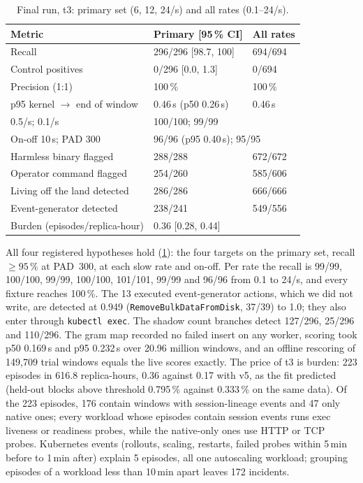 \begin{table}[t]
\centering\small
\caption{Final run, t3: primary set (6, 12, 24/s) and all rates (0.1--24/s).}
\label{tab:final}
\begin{tabular}{@{}lll@{}}
\toprule
Metric & Primary [95\,\% CI] & All rates \\
\midrule
Recall & 296/296 [98.7, 100] & 694/694 \\
Control positives & 0/296 [0.0, 1.3] & 0/694 \\
Precision (1:1) & 100\,\% & 100\,\% \\
p95 kernel $\to$ end of window & 0.46\,s (p50 0.26\,s) & 0.46\,s \\
0.5/s; 0.1/s & \multicolumn{2}{l}{100/100; 99/99} \\
On-off 10\,s; PAD 300 & \multicolumn{2}{l}{96/96 (p95 0.40\,s); 95/95} \\
Harmless binary flagged & 288/288 & 672/672 \\
Operator command flagged & 254/260 & 585/606 \\
Living off the land detected & 286/286 & 666/666 \\
Event-generator detected & 238/241 & 549/556 \\
Burden (episodes/replica-hour) & \multicolumn{2}{l}{0.36 [0.28, 0.44]} \\
\bottomrule
\end{tabular}
\end{table}

All four registered hypotheses hold (\cref{tab:final}): the four targets on the primary set, recall $\ge 95\,\%$ at
PAD~300, at each slow rate and on-off. Per rate the recall is 99/99, 100/100, 99/99, 100/100, 101/101, 99/99 and 96/96
from 0.1 to 24/s, and every fixture reaches 100\,\%. The 13 executed event-generator actions, which we did not write,
are detected at 0.949 (\texttt{RemoveBulkDataFromDisk}, 37/39) to 1.0; they also enter through \texttt{kubectl exec}.
The shadow count branches detect 127/296, 25/296 and 110/296. The gram map recorded no failed insert on any worker,
scoring took p50 0.169\,s and p95 0.232\,s over 20.96 million windows, and an offline rescoring of 149{,}709 trial
windows equals the live scores exactly. The price of t3 is burden: 223 episodes in 616.8 replica-hours, 0.36 against
0.17 with v5, as the fit predicted (held-out blocks above threshold 0.795\,\% against 0.333\,\% on the same data).
Of the 223 episodes, 176 contain windows with session-lineage events and 47 only native ones; every workload whose
episodes contain session events runs exec liveness or readiness probes, while the native-only ones use HTTP or TCP
probes. Kubernetes events (rollouts, scaling, restarts, failed probes within 5\,min before to 1\,min after) explain 5
episodes, all one autoscaling workload; grouping episodes of a workload less than 10\,min apart leaves 172 incidents.


